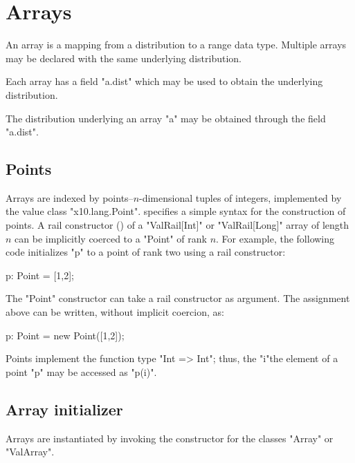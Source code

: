 \chapter{Arrays}\label{XtenArrays}

An array is a mapping from a distribution to a range data
type. Multiple arrays may be declared with the same underlying
distribution. 

Each array has a field \xcd"a.dist" which may be used to
obtain the underlying
distribution.

The distribution underlying an array \xcd"a" may be obtained through
the field \xcd"a.dist".

\section{Points}\label{point-syntax}

Arrays are indexed by points--$n$-dimensional tuples of
integers, implemented by the value class \xcd"x10.lang.Point".
\Xten{} specifies a simple syntax for the construction of points.
A rail constructor () of a \xcd"ValRail[Int]" or
\xcd"ValRail[Long]" array of length $n$
can be implicitly coerced to a \xcd"Point" of rank $n$.  For
example, the following code initializes \xcd"p" to a point of
rank two using a rail constructor:

\begin{xten}
p: Point = [1,2];
\end{xten}

The \xcd"Point" constructor can take a rail constructor as
argument.  The assignment above can be written, without
implicit coercion, as:

\begin{xten}
p: Point = new Point([1,2]);
\end{xten}

Points implement the function type \xcd"Int => Int"; thus, the
\xcd"i"the element of a point \xcd"p" may be accessed as \xcd"p(i)".



\section{Array initializer}\label{ArrayInitializer}\label{array!creation}

Arrays are instantiated by invoking the constructor for the
classes
\xcd"Array" or \xcd"ValArray".

